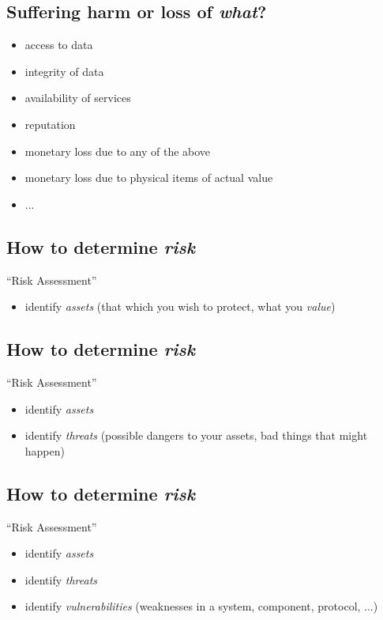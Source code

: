 \documentclass[xga]{xdvislides}
\begin{document}
\subsection{Suffering harm or loss of {\em what}?}

\begin{itemize}
	\item access to data
	\item integrity of data
	\item availability of services
	\item reputation
	\item monetary loss due to any of the above
	\item monetary loss due to physical items of actual value
	\item ...
\end{itemize}


\subsection{How to determine {\em risk}}
``Risk Assessment''
\begin{itemize}
	\item identify {\em assets} (that which you wish to protect, what you {\em value})
\end{itemize}

\subsection{How to determine {\em risk}}
``Risk Assessment''
\begin{itemize}
	\item identify {\em assets}
	\item identify {\em threats} (possible dangers to your assets, bad things that might happen)
\end{itemize}


\subsection{How to determine {\em risk}}
``Risk Assessment''
\begin{itemize}
	\item identify {\em assets}
	\item identify {\em threats}
	\item identify {\em vulnerabilities} (weaknesses in a system, component, protocol, ...)
\end{itemize}
\end{document}

